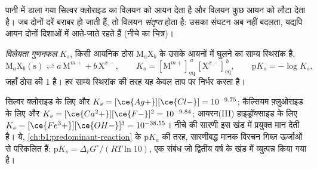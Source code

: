 पानी में डाला गया सिल्वर क्लोराइड का  विलयन को आयन देता है
और विलयन कुछ आयन  को लौटा देता है। जब दोनों
दरें बराबर हो जाती हैं, तो विलयन \emph{संतृप्त} होता है: उसका संघटन अब
नहीं बदलता, यद्यपि आयन दोनों दिशाओं में आते-जाते रहते हैं
(नीचे का चित्र)।

\begin{definition}[विलेयता गुणनफल]\label{def:b1:precipitation:solubility-product}
\emph{विलेयता गुणनफल} $K_s$, किसी आयनिक ठोस
$\mathrm{M}_a\mathrm{X}_b$ के उसके आयनों में घुलने का साम्य स्थिरांक
है,
\[
  \mathrm{M}_a\mathrm{X}_b\mathrm{(s)} \rightleftharpoons a\,\mathrm{M}^{m+}
  + b\,\mathrm{X}^{x-}, \qquad
  K_s = [\mathrm{M}^{m+}]_{\mathrm{eq}}^{\,a}\,[\mathrm{X}^{x-}]_{\mathrm{eq}}^{\,b},
  \qquad \mathrm{p}K_s = -\log K_s ,
\]
जहाँ ठोस की  1 है। हर साम्य स्थिरांक की तरह यह
केवल ताप पर निर्भर करता है।
\end{definition}

सिल्वर क्लोराइड के लिए  और $K_s =
[\ce{Ag+}][\ce{Cl-}] = 10^{-9.75}$; कैल्सियम फ़्लुओराइड के लिए  और $K_s = [\ce{Ca^2+}][\ce{F-}]^2 = 10^{-9.84}$;
आयरन(III) हाइड्रॉक्साइड के लिए $K_s = [\ce{Fe^3+}][\ce{OH-}]^3 = 10^{-38.55}$।
नीचे की सारणी इस खंड में प्रयुक्त मान देती है।
ये, \cref{ch:b1:predominant-reaction} के $\mathrm{p}K_a$ की तरह, सारणीबद्ध मानक
विरचन गिब्ज़ ऊर्जाओं से परिकलित हैं: $\mathrm{p}K_s = \Delta_r G^\circ/(RT\ln 10)$, एक संबंध
जो द्वितीय वर्ष के खंड में व्युत्पन्न किया गया है।

